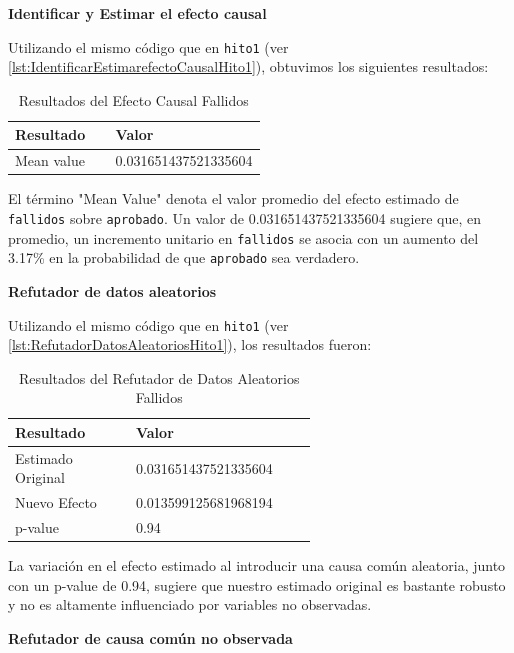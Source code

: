 \textbf{Identificar y Estimar el efecto causal}

Utilizando el mismo código que en \texttt{hito1} (ver \ref{lst:IdentificarEstimarefectoCausalHito1}), obtuvimos los siguientes resultados:

\begin{table}[H]
    \centering        
    \begin{tabular}{lp{0.6\linewidth}}
        \toprule
        \textbf{Resultado} & \textbf{Valor} \\
        \midrule
        Mean value & 0.031651437521335604 \\
        \bottomrule
    \end{tabular}
    \caption{Resultados del Efecto Causal Fallidos}
    \label{tab:efecto_causal_Fallidos}
\end{table}

El término "Mean Value" denota el valor promedio del efecto estimado de \texttt{fallidos} sobre \texttt{aprobado}. Un valor de 0.031651437521335604 sugiere que, en promedio, un incremento unitario en \texttt{fallidos} se asocia con un aumento del 3.17\% en la probabilidad de que \texttt{aprobado} sea verdadero.

\textbf{Refutador de datos aleatorios}

Utilizando el mismo código que en \texttt{hito1} (ver \ref{lst:RefutadorDatosAleatoriosHito1}), los resultados fueron:

\begin{table}[H]
    \centering        
    \begin{tabular}{lp{0.6\linewidth}}
        \toprule
        \textbf{Resultado} & \textbf{Valor} \\
        \midrule
        Estimado Original & 0.031651437521335604 \\
        Nuevo Efecto & 0.013599125681968194 \\
        p-value & 0.94 \\
        \bottomrule
    \end{tabular}
    \caption{Resultados del Refutador de Datos Aleatorios Fallidos}
    \label{tab:refutador_datos_aleatorios_Fallidos}
\end{table}

La variación en el efecto estimado al introducir una causa común aleatoria, junto con un p-value de 0.94, sugiere que nuestro estimado original es bastante robusto y no es altamente influenciado por variables no observadas.

\textbf{Refutador de causa común no observada}

